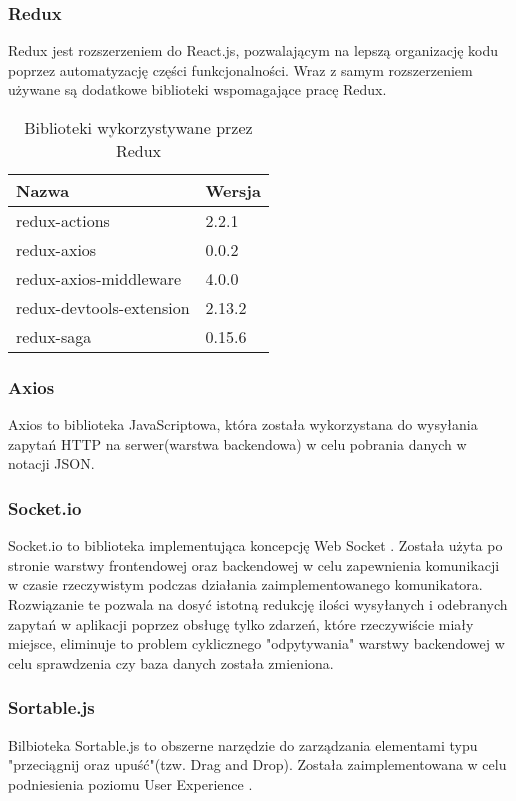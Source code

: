 \documentclass[eng,printmode]{mgr}
\begin{document}
\subsubsection{Redux}
Redux \cite{Redux} jest rozszerzeniem do React.js, pozwalającym na lepszą organizację kodu poprzez automatyzację części funkcjonalności. Wraz z samym rozszerzeniem używane są dodatkowe biblioteki wspomagające pracę Redux.

\begin{table}[H]
\begin{tabularx}{\textwidth}{|X|X|}
   \hline
    \textbf{Nazwa} & \textbf{Wersja} \\
   \hline
    redux-actions & 2.2.1 \\
   \hline
   	redux-axios & 0.0.2 \\
   \hline
  	redux-axios-middleware & 4.0.0 \\
   \hline
   	redux-devtools-extension & 2.13.2 \\
   \hline
  	redux-saga & 0.15.6 \\
   \hline
\end{tabularx}
\caption{Biblioteki wykorzystywane przez Redux}
\end{table}


\subsubsection{Axios}
Axios \cite{Axios} to biblioteka JavaScriptowa, która została wykorzystana do wysyłania zapytań HTTP na serwer(warstwa backendowa) w celu pobrania danych w notacji JSON.

\subsubsection{Socket.io}
Socket.io \cite{SocketIO} to biblioteka implementująca koncepcję Web Socket \cite{Keyword_Websocket}. Została użyta po stronie warstwy frontendowej oraz backendowej w celu zapewnienia komunikacji w czasie rzeczywistym podczas działania zaimplementowanego komunikatora. Rozwiązanie te pozwala na dosyć istotną redukcję ilości wysyłanych i odebranych zapytań w aplikacji poprzez obsługę tylko zdarzeń, które rzeczywiście miały miejsce, eliminuje to problem cyklicznego "odpytywania" warstwy backendowej w celu sprawdzenia czy baza danych została zmieniona.

\subsubsection{Sortable.js}
Bilbioteka Sortable.js \cite{SortableJS} to obszerne narzędzie do zarządzania elementami typu "przeciągnij oraz upuść"(tzw. Drag and Drop). Została zaimplementowana w celu podniesienia poziomu User Experience \cite{Keyword_UserExperience}.
\end{document}
